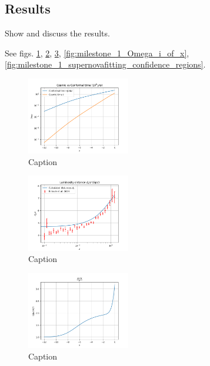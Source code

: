 \subsection{Results}
Show and discuss the results.

See figs. \ref{fig:milestone_1_cosmic_vs_conformal_time}, \ref{fig:milestone_1_luminosity_distance}, \ref{fig:milestone_1_etaHp_over_c_of_x}, \ref{fig:milestone_1_Omega_i_of_x}, \ref{fig:milestone_1_supernovafitting_confidence_regions}.

\begin{figure}[h!tbp]
\centering
\includegraphics[width=0.4\textwidth]{../Milestone 1/Plots/cosmic_vs_conformal_time.png}
\caption{Caption}
\label{fig:milestone_1_cosmic_vs_conformal_time}
\end{figure}

\begin{figure}[h!tbp]
\centering
\includegraphics[width=0.4\textwidth]{../Milestone 1/Plots/luminosity_distance.png}
\caption{Caption}
\label{fig:milestone_1_luminosity_distance}
\end{figure}

\begin{figure}[h!tbp]
\centering
\includegraphics[width=0.4\textwidth]{../Milestone 1/Plots/etaHp_over_c_of_x.png}
\caption{Caption}
\label{fig:milestone_1_etaHp_over_c_of_x}
\end{figure}

